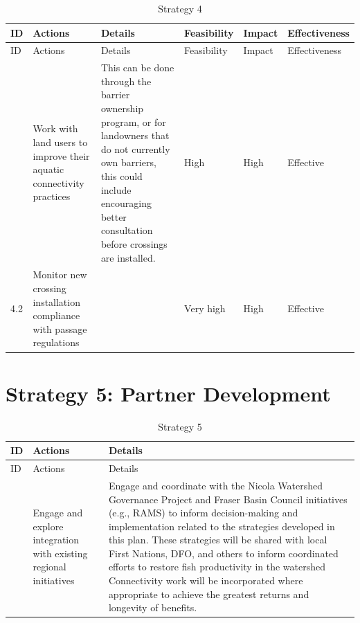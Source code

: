 \documentclass[
  letterpaper,
  DIV=11,
  numbers=noendperiod]{scrreprt}
\begin{document}
\hypertarget{tbl-S4}{}
\begin{longtable}[]{@{}llllll@{}}
\caption{\label{tbl-S4}Strategy 4}\label{T_67f50}\tabularnewline
\toprule\noalign{}
ID & Actions & Details & Feasibility & Impact & Effectiveness \\
\midrule\noalign{}
\endfirsthead
\toprule\noalign{}
ID & Actions & Details & Feasibility & Impact & Effectiveness \\
\midrule\noalign{}
\endhead
\bottomrule\noalign{}
\endlastfoot
4.1 & Work with land users to improve their aquatic connectivity
practices & This can be done through the barrier ownership program, or
for landowners that do not currently own barriers, this could include
encouraging better consultation before crossings are installed. & High &
High & Effective \\
4.2 & Monitor new crossing installation compliance with passage
regulations & & Very high & High & Effective \\
\end{longtable}

\hypertarget{strategy-5-partner-development}{%
\section*{Strategy 5: Partner
Development}\label{strategy-5-partner-development}}


\hypertarget{tbl-S5}{}
\begin{longtable}[]{@{}lll@{}}
\caption{\label{tbl-S5}Strategy 5}\label{T_e30b6}\tabularnewline
\toprule\noalign{}
ID & Actions & Details \\
\midrule\noalign{}
\endfirsthead
\toprule\noalign{}
ID & Actions & Details \\
\midrule\noalign{}
\endhead
\bottomrule\noalign{}
\endlastfoot
5.1 & Engage and explore integration with existing regional initiatives
& Engage and coordinate with the Nicola Watershed Governance Project and
Fraser Basin Council initiatives (e.g., RAMS) to inform decision-making
and implementation related to the strategies developed in this plan.
These strategies will be shared with local First Nations, DFO, and
others to inform coordinated efforts to restore fish productivity in the
watershed Connectivity work will be incorporated where appropriate to
achieve the greatest returns and longevity of benefits. \\
\end{longtable}
\end{document}
